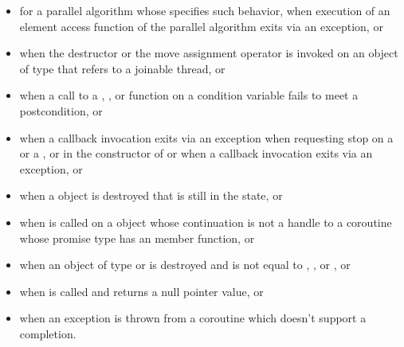 \begin{note}
\begin{itemize}
\item%
for a parallel algorithm whose  specifies such
behavior,
when execution of an element access function
of the parallel algorithm exits via an exception, or

\item%
when the destructor or the move assignment operator is invoked on an object
of type  that refers to
a joinable thread, or

\item%
when a call to a , , or 
function on a condition variable
fails to meet a postcondition, or

\item%
when a callback invocation exits via an exception
when requesting stop on
a  or
a ,
or in the constructor of
 or
when a callback invocation exits via an exception, or

\item%
when a  object is destroyed
that is still in the  state, or

\item%
when  is called on
a  object
whose continuation is not a handle to a coroutine
whose promise type has an  member function, or

\item%
when an object  of type
 or
is destroyed and
 is not equal to
,
, or
, or

\item%
when  is called and
returns a null pointer value, or

\item%
when an exception is thrown from a coroutine 
which doesn't support a  completion.
\end{itemize}
\end{note}

